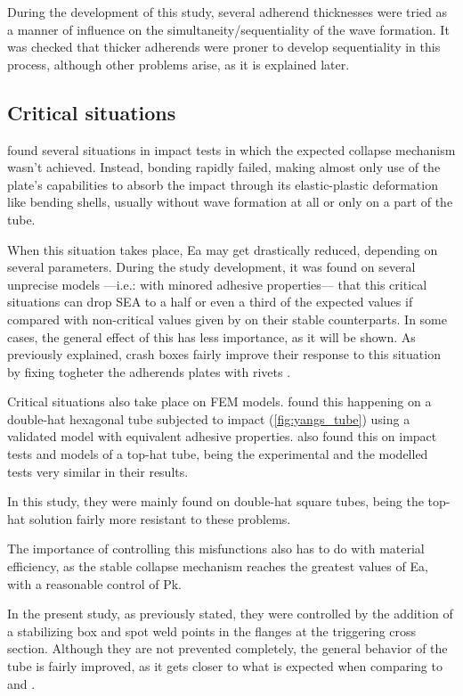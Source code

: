 \documentclass[cmfonts]{witpress}
\begin{document}
During the development of this study, several adherend thicknesses were tried as a manner of influence on the simultaneity/sequentiality of the wave formation. It was checked that thicker adherends were proner to develop sequentiality in this process, although other problems arise, as it is explained later.

\subsection{Critical situations}
\label{sec:critical_sits}
\cite{Peroni2009} found several situations in impact tests in which the expected collapse mechanism wasn't achieved. Instead, bonding rapidly failed, making almost only use of the plate's capabilities to absorb the impact through its elastic-plastic deformation like bending shells, usually without wave formation at all or only on a part of the tube.

When this situation takes place, Ea may get drastically reduced, depending on several parameters. During the study development, it was found on several unprecise models ---i.e.: with minored adhesive properties--- that this critical situations can drop SEA to a half or even a third of the expected values if compared with non-critical values given by \cite{Peroni2009} on their stable counterparts. In some cases, the general effect of this has less importance, as it will be shown. As previously explained, crash boxes fairly improve their response to this situation by fixing togheter the adherends plates with rivets \cite{Peroni2009}.

Critical situations also take place on FEM models. \cite{Yang2012} found this happening on a double-hat hexagonal tube subjected to impact (\cref{fig:yangs_tube}) using a validated model with equivalent adhesive properties. \cite{Yamashita2013} also found this on impact tests and models of a top-hat tube, being the experimental and the modelled tests very similar in their results.

In this study, they were mainly found on double-hat square tubes, being the top-hat solution fairly more resistant to these problems.

The importance of controlling this misfunctions also has to do with material efficiency, as the stable collapse mechanism reaches the greatest values of Ea, with a reasonable control of Pk.

In the present study, as previously stated, they were controlled by the addition of a stabilizing box and spot weld points in the flanges at the triggering cross section. Although they are not prevented completely, the general behavior of the tube is fairly improved, as it gets closer to what is expected when comparing to \cite{Peroni2009} and \cite{Scattina2011}.
\end{document}
